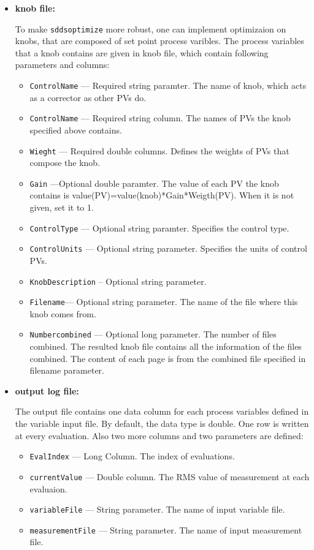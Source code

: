 \begin{itemize}
\begin{itemize}
\begin{itemize}
\end{itemize}

\item {\bf knob file:} \par
To make \verb+sddsoptimize+ more robust, one can implement optimizaion on knobs,
that are composed of set point process varibles. The process variables that a knob contains are
given in knob file, which contain following parameters and columns:
\begin{itemize}
        \item {\tt ControlName} --- Required string paramter. The name of knob, which
                acts as a corrector as other PVs do.
        \item {\tt ControlName} --- Required string column. The names of PVs the knob
                specified above contains.
        \item {\tt Wieght} --- Required double columns. Defines the weights of PVs that
                compose the knob.
        \item {\tt Gain} ---Optional double paramter. The value of each PV the knob contains
                is value(PV)=value(knob)*Gain*Weigth(PV). When it is not given, set it to 1.
        \item {\tt ControlType} --- Optional string paramter. Specifies the control type.
        \item {\tt ControlUnits}  --- Optional string parameter.
                 Specifies the units of control PVs.
        \item {\tt KnobDescription} -- Optional string parameter.
        \item {\tt Filename}--- Optional string parameter. The name of the file where 
                this knob comes from.
        \item {\tt Numbercombined} --- Optional long parameter. The number of files combined.
                The resulted knob file contains all the information of the files combined.
                The content of each page is from the combined file specified in filename parameter.
\end{itemize}

\item {\bf output log file:} \par
The output file contains one data column for each process variables defined in the variable 
input file. By default, the data type is double. One row is written at every evaluation.
Also two more columns and two parameters are defined: 
\begin{itemize}
        \item {\tt EvalIndex} --- Long Column. The index of evaluations.
        \item {\tt currentValue} --- Double column. The RMS value of measurement at each evaluaion.
        \item {\tt variableFile} --- String parameter. The name of input variable file.
        \item {\tt measurementFile} --- String parameter. The name of input measurement file.
\end{itemize}


\end{itemize}
\end{itemize}
